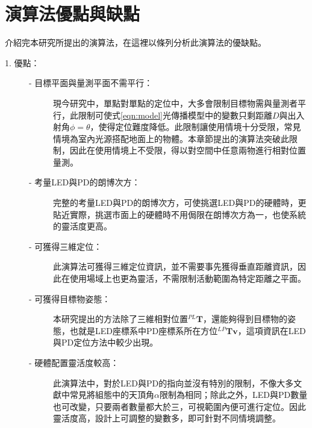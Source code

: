 \section{演算法優點與缺點}


介紹完本研究所提出的演算法，在這裡以條列分析此演算法的優缺點。


\begin{description}
    \item[1. 優點：]\hfill
    
    \begin{description}
        \item[- 目標平面與量測平面不需平行：]\hfill
        
        \qquad
        現今研究中，單點對單點的定位中，大多會限制目標物需與量測者平行，此限制可使式\ref{eqn:model}光傳播模型中的變數只剩距離$D$與出入射角$\phi=\theta$，使得定位難度降低。此限制讓使用情境十分受限，常見情境為室內光源搭配地面上的物體。本章節提出的演算法突破此限制，因此在使用情境上不受限，得以對空間中任意兩物進行相對位置量測。
    
        \item[- 考量LED與PD的朗博次方：]\hfill
        
        \qquad
        完整的考量LED與PD的朗博次方，可使挑選LED與PD的硬體時，更貼近實際，挑選市面上的硬體時不用侷限在朗博次方為一，也使系統的靈活度更高。

        \item[- 可獲得三維定位：] \hfill
        
        \qquad
        此演算法可獲得三維定位資訊，並不需要事先獲得垂直距離資訊，因此在使用場域上也更為靈活，不需限制活動範圍為特定距離之平面。

        \item[- 可獲得目標物姿態：] \hfill
        
        \qquad
        本研究提出的方法除了三維相對位置$^{PL}\boldsymbol{T}$，還能夠得到目標物的姿態，也就是LED座標系中PD座標系所在方位$^{LP}\boldsymbol{Tv}$，這項資訊在LED與PD定位方法中較少出現。
        
        \item[- 硬體配置靈活度較高：] \hfill
        
        \qquad
        此演算法中，對於LED與PD的指向並沒有特別的限制，不像大多文獻中常見將組態中的天頂角$\alpha$限制為相同；除此之外，LED與PD數量也可改變，只要兩者數量都大於三，可視範圍內便可進行定位。因此靈活度高，設計上可調整的變數多，即可針對不同情境調整。
    
    \end{description}


\end{description}
